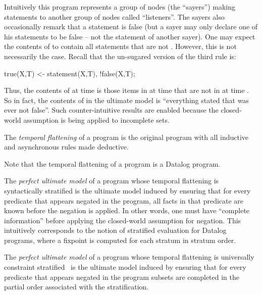 Intuitively this program represents a group of nodes (the ``sayers'') making statements to another group of nodes called ``listeners''.  The sayers also occasionally remark that a statement is false (but a sayer may only declare one of his statements to be false -- not the statement of another sayer).  One may expect the contents of  to contain all statements that are not .  However, this is not necessarily the case.  Recall that the un-sugared version of the third rule is:

\begin{Dedalus}
true(X,T) <- statement(X,T), !false(X,T);
\end{Dedalus}

Thus, the contents of  at time  is those items in  at time  that are not in  at time .  So in fact, the contents of  in the ultimate model is ``everything stated that was ever not false''.  Such counter-intuitive results are enabled because the closed-world assumption is being applied to incomplete sets.

\begin{definition}
The {\em temporal flattening} of a \lang program is the original program with all inductive and asynchronous rules made deductive.
\end{definition}

Note that the temporal flattening of a \lang program is a Datalog program.

\begin{definition}
The {\em perfect ultimate model} of a \lang program whose temporal flattening is syntactically stratified is the ultimate model induced by ensuring that for every predicate that appears negated in the program, all facts in that predicate are known before the negation is applied.  In other words, one must have ``complete information'' before applying the closed-world assumption for negation.  This intuitively corresponds to the notion of stratified evaluation for Datalog programs, where a fixpoint is computed for each stratum in stratum order.
\end{definition}

\begin{definition}
The {\em perfect ultimate model} of a \lang program whose temporal flattening is universally constraint stratified~\cite{ross-ucs} is the ultimate model induced by ensuring that for every predicate that appears negated in the program subsets are completed in the partial order associated with the stratification.
\end{definition}


